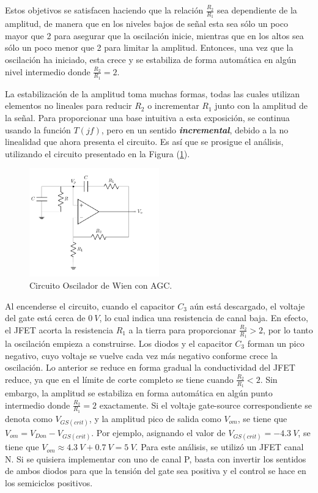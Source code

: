 Estos objetivos se satisfacen haciendo que la relación $\frac{R_2}{R_1}$ sea dependiente de la
amplitud, de manera que en los niveles bajos de señal esta sea sólo un poco mayor que 2
para asegurar que la oscilación inicie, mientras que en los altos sea sólo un poco
menor que 2 para limitar la amplitud. Entonces, una vez que la oscilación ha iniciado, esta
crece y se estabiliza de forma automática en algún nivel intermedio donde $\frac{R_2}{R_1}=2$.

La estabilización de la amplitud toma muchas formas, todas las cuales utilizan elementos no lineales para reducir $R_2$ o incrementar $R_1$ junto con la amplitud de la señal. Para proporcionar una base intuitiva a esta exposición, se continua usando la función $T(jf)$, pero en un sentido \emph{\textbf{incremental}}, debido a la no linealidad que ahora presenta el circuito. Es así que se prosigue el análisis, utilizando el circuito presentado en la Figura (\ref{fig:circosc}).
\begin{figure}[H]
	\centering
	\includegraphics[width=0.5\textwidth, page=2]{Imagenes-Ej1/Circuitos1.pdf}
	\caption{Circuito Oscilador de Wien con AGC.}
	\label{fig:circosc}
\end{figure}

Al encenderse el circuito, cuando el capacitor $C_3$ aún está descargado, el voltaje del gate está cerca de $0 \ V$, lo cual indica una resistencia de canal baja. En efecto, el JFET acorta la resistencia $R_1$ a la tierra para proporcionar $\frac{R_2}{R_1}>2$, por lo tanto la oscilación empieza a construirse. Los diodos y el capacitor $C_3$ forman un pico negativo, cuyo voltaje se vuelve cada vez más negativo conforme crece la oscilación. Lo anterior se reduce en forma gradual la conductividad del JFET reduce, ya que en el límite de corte completo se tiene cuando $\frac{R_2}{R_1}<2$. Sin embargo, la amplitud se estabiliza en forma automática en algún punto intermedio donde $\frac{R_2}{R_1}=2$ exactamente. Si el voltaje gate-source correspondiente se denota como $V_{GS(crit)}$, y la amplitud pico de salida como $V_{om}$, se tiene que $V_{om} = V_{Don} - V_{GS(crit)}$. Por ejemplo, asignando el valor de $V_{GS(crit)} = -4.3 \ V$, se tiene que $V_{om} \approx 4.3 \ V + 0.7 \ V = 5 \ V$. Para este análisis, se utilizó un JFET canal N. Si se quisiera implementar con uno de canal P, basta con invertir los sentidos de ambos diodos para que la tensión del gate sea positiva y el control se hace en los semiciclos positivos.

